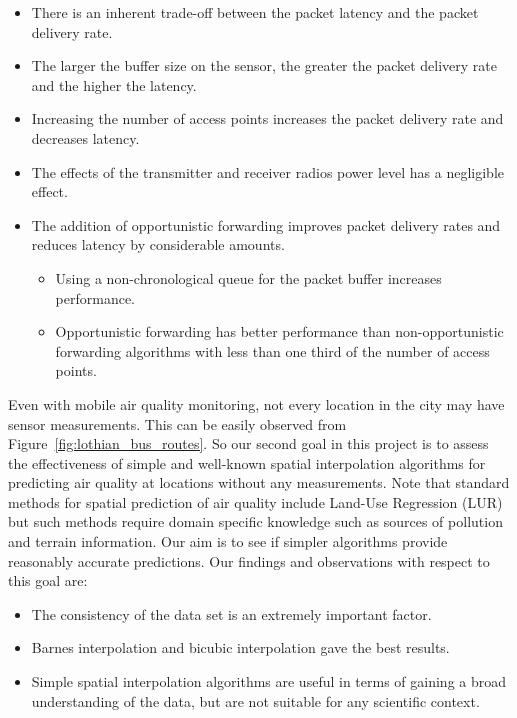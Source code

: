     \begin{itemize}
        \item There is an inherent trade-off between the packet latency and the packet delivery rate.
        \item The larger the buffer size on the sensor, the greater the packet delivery rate and the higher the latency.
        \item Increasing the number of access points increases the packet delivery rate and decreases latency.
        \item The effects of the transmitter and receiver radios power level has a negligible effect.
        \item The addition of opportunistic forwarding improves packet delivery rates and reduces latency by considerable amounts.
        \begin{itemize}
            \item Using a non-chronological queue for the packet buffer increases performance.
            \item Opportunistic forwarding has better performance than non-opportunistic forwarding algorithms with less than one third of the number of access points.
        \end{itemize}
    \end{itemize}


    Even with mobile air quality monitoring, not every location in the city may have sensor measurements. This can be easily observed from Figure~\ref{fig:lothian_bus_routes}. So our second goal in this project is to assess the effectiveness of simple and well-known spatial interpolation algorithms for predicting air quality at locations without any measurements. Note that standard methods for spatial prediction of air quality include Land-Use Regression (LUR) but such methods require domain specific knowledge such as sources of pollution and terrain information. Our aim is to see if simpler algorithms provide reasonably accurate predictions. Our findings and observations with respect to this goal are:

    \begin{itemize}
        \item The consistency of the data set is an extremely important factor.
        \item Barnes interpolation and bicubic interpolation gave the best results.
        \item Simple spatial interpolation algorithms are useful in terms of gaining a broad understanding of the data, but are not suitable for any scientific context.
    \end{itemize}

